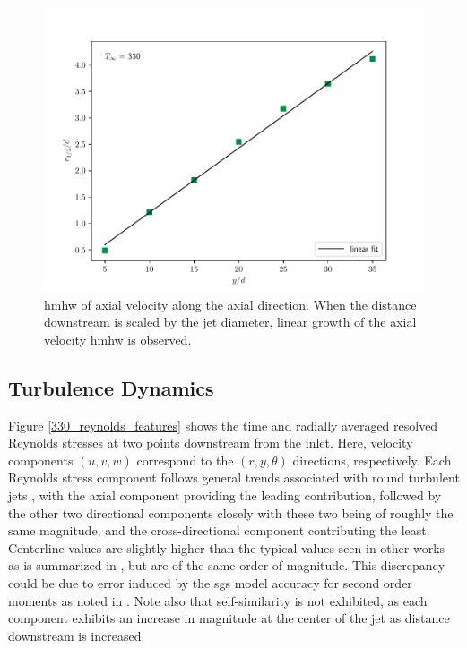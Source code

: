 \begin{figure}[H]
\begin{center}
	\includegraphics[scale=.7]{figures/Plots/radial/slices_5/same_ambient/r12_d_vs_x_d.pdf}
	\caption{\gls{hmhw} of axial velocity along the axial direction. When the distance downstream is scaled by the jet diameter, linear growth of the axial velocity \gls{hmhw} is observed.} \label{330_hwhm_scaling}
\end{center}
\end{figure}

\subsection{Turbulence Dynamics}
Figure \ref{330_reynolds_features} shows the time and radially averaged resolved Reynolds stresses at two points downstream from the inlet. Here, velocity components $(u,v,w)$ correspond to the $(r,y,\theta)$ directions, respectively. Each Reynolds stress component follows general trends associated with round turbulent jets \cite{Pope, iso_comp_1_ref_1}, with the axial component providing the leading contribution, followed by the other two directional components closely with these two being of roughly the same magnitude, and the cross-directional component contributing the least. Centerline values are slightly higher than the typical values seen in other works as is summarized in \cite{iso_comp_1_ref_1}, but are of the same order of magnitude. This discrepancy could be due to error induced by the \gls{sgs} model accuracy for second order moments as noted in \cite{doi:10.1063/1.4937948}. Note also that self-similarity is not exhibited, as each component exhibits an increase in magnitude at the center of the jet as distance downstream is increased. 

